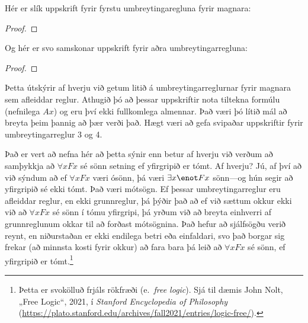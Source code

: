 Hér er slík uppskrift fyrir fyrstu umbreytingaregluna fyrir magnara:
\begin{proof}
	\open
		\open
		\close
	\close
\end{proof}
Og hér er svo samskonar uppskrift fyrir aðra umbreytingarregluna:
\begin{proof}
	\open
		\open
		\close
	\close
\end{proof}
Þetta útskýrir af hverju við getum litið á umbreytingarreglurnar fyrir magnara sem afleiddar reglur. Athugið þó að þessar uppskriftir nota tiltekna formúlu (nefnilega $Ax$) og eru því ekki fullkomlega almennar. Það væri þó lítið mál að breyta þeim þannig að þær verði það. Hægt væri að gefa svipaðar uppskriftir fyrir umbreytingarreglur 3 og 4.

Það er vert að nefna hér að þetta sýnir enn betur af hverju við verðum að samþykkja að $\forall x Fx$ sé sönn setning ef yfirgripið er tómt. Af hverju? Jú, af því að við sýndum að ef $\forall x Fx$ væri ósönn, þá væri $\exists x \enot Fx$ sönn---og hún segir að yfirgripið sé ekki tómt. Það væri mótsögn. Ef þessar umbreytingarreglur eru afleiddar reglur, en ekki grunnreglur, þá þýðir það að ef við sættum okkur ekki við að $\forall x Fx$ sé sönn í tómu yfirgripi, þá yrðum við að breyta einhverri af grunnreglunum okkar til að forðast mótsögnina. Það hefur að sjálfsögðu verið reynt, en niðurstaðan er ekki endilega betri eða einfaldari, svo það borgar sig frekar (að minnsta kosti fyrir okkur) að fara bara þá leið að $\forall x Fx$ sé sönn, ef yfirgripið er tómt.\footnote{Þetta er svokölluð frjáls rökfræði (e.\ \emph{free logic}). Sjá til dæmis John Nolt, „Free Logic“, 2021, í \emph{Stanford Encyclopedia of Philosophy} (\url{https://plato.stanford.edu/archives/fall2021/entries/logic-free/}). }

